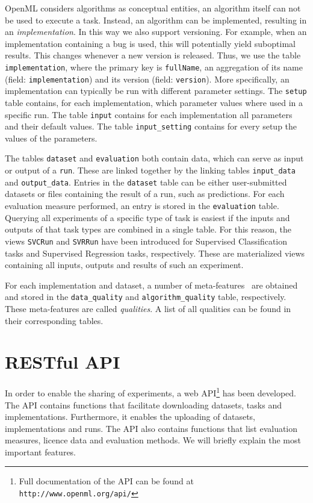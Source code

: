 \documentclass[10pt, twoside]{article}
\begin{document}
OpenML considers algorithms as conceptual entities, an algorithm itself can not be used to execute a task. Instead, an algorithm can be implemented, resulting in an \emph{implementation}. In this way we also support versioning. For example, when an implementation containing a bug is used, this will potentially yield suboptimal results. This changes whenever a new version is released. Thus, we use the table \texttt{implementation}, where the primary key is \texttt{fullName}, an aggregation of its name (field: \texttt{implementation}) and its version (field: \texttt{version}). More specifically, an implementation can typically be run with different parameter settings. The \texttt{setup} table contains, for each implementation, which parameter values where used in a specific run. The table \texttt{input} contains for each implementation all parameters and their default values. The table \texttt{input\_setting} contains for every setup the values of the parameters. 

The tables \texttt{dataset} and \texttt{evaluation} both contain data, which can serve as input or output of a \texttt{run}. These are linked together by the linking tables \texttt{input\_data} and \texttt{output\_data}. 
Entries in the \texttt{dataset} table can be either user-submitted datasets or files containing the result of a run, such as predictions. For each evaluation measure performed, an entry is stored in the \texttt{evaluation} table. 
Querying all experiments of a specific type of task is easiest if the inputs and outputs of that task types are combined in a single table. For this reason, the views \texttt{SVCRun} and \texttt{SVRRun} have been introduced for Supervised Classification tasks and Supervised Regression tasks, respectively. These are materialized views containing all inputs, outputs and results of such an experiment. 

For each implementation and dataset, a number of meta-features~\cite{Peng2002} are obtained and stored in the \texttt{data\_quality} and \texttt{algorithm\_quality} table, respectively. These meta-features are called \emph{qualities}. A list of all qualities can be found in their corresponding tables. 

\section{RESTful API}
\label{sec:API}
In order to enable the sharing of experiments, a web API\footnote{Full documentation of the API can be found at \texttt{http://www.openml.org/api/}} has been developed. The API contains functions that facilitate downloading datasets, tasks and implementations. Furthermore, it enables the uploading of datasets, implementations and runs. The API also contains functions that list evaluation measures, licence data and evaluation methods. We will briefly explain the most important features. 
\end{document}
